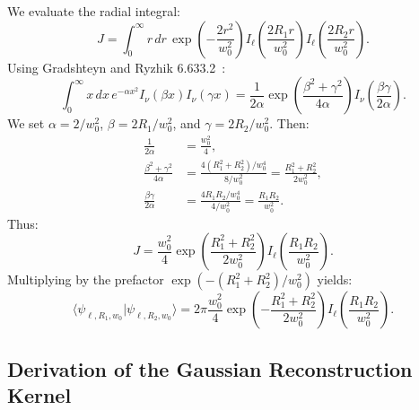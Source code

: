 \documentclass{optica-article}
\begin{document}
We evaluate the radial integral:
\begin{equation}
J = \int_0^\infty r \, dr \, \exp\left( - \frac{2 r^2}{w_0^2} \right) I_\ell\left( \frac{2 R_1 r}{w_0^2} \right) I_\ell\left( \frac{2 R_2 r}{w_0^2} \right).
\end{equation}
Using Gradshteyn and Ryzhik 6.633.2~\cite{Gradshteyn2014}:
\begin{equation}
\int_0^\infty x \, dx \, e^{-\alpha x^2} I_\nu(\beta x) I_\nu(\gamma x) = \frac{1}{2\alpha} \exp\left( \frac{\beta^2 + \gamma^2}{4\alpha} \right) I_\nu\left( \frac{\beta \gamma}{2\alpha} \right).
\end{equation}
We set $\alpha = 2 / w_0^2$, $\beta = 2 R_1 / w_0^2$, and $\gamma = 2 R_2 / w_0^2$. Then:
\begin{align}
\frac{1}{2\alpha} &= \frac{w_0^2}{4}, \\
\frac{\beta^2 + \gamma^2}{4\alpha} &= \frac{4(R_1^2 + R_2^2) / w_0^4}{8 / w_0^2} = \frac{R_1^2 + R_2^2}{2 w_0^2}, \\
\frac{\beta \gamma}{2\alpha} &= \frac{4 R_1 R_2 / w_0^4}{4 / w_0^2} = \frac{R_1 R_2}{w_0^2}.
\end{align}
Thus:
\begin{equation}
J = \frac{w_0^2}{4} \exp\left( \frac{R_1^2 + R_2^2}{2 w_0^2} \right) I_\ell\left( \frac{R_1 R_2}{w_0^2} \right).
\end{equation}
Multiplying by the prefactor $\exp(-(R_1^2 + R_2^2)/w_0^2)$ yields:
\begin{equation}
\langle \psi_{\ell, R_1, w_0} | \psi_{\ell, R_2, w_0} \rangle = 2\pi \frac{w_0^2}{4} \exp\left( - \frac{R_1^2 + R_2^2}{2 w_0^2} \right) I_\ell\left( \frac{R_1 R_2}{w_0^2} \right).
\end{equation}

\subsection{Derivation of the Gaussian Reconstruction Kernel}
\end{document}
